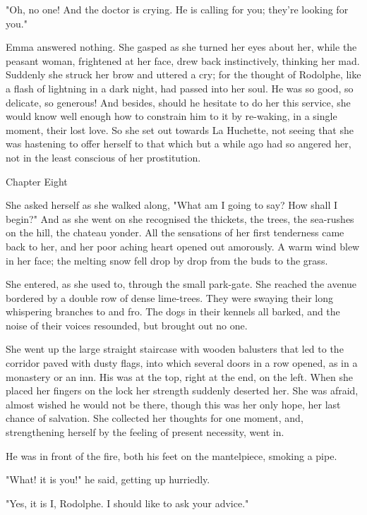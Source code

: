 \documentclass[11pt,twocolumn]{ltugboat}
\begin{document}
"Oh, no one! And the doctor is crying. He is calling for you; they're
looking for you."

Emma answered nothing. She gasped as she turned her eyes about
her, while the peasant woman, frightened at her face, drew back
instinctively, thinking her mad. Suddenly she struck her brow and
uttered a cry; for the thought of Rodolphe, like a flash of lightning in
a dark night, had passed into her soul. He was so good, so delicate, so
generous! And besides, should he hesitate to do her this service, she
would know well enough how to constrain him to it by re-waking, in a
single moment, their lost love. So she set out towards La Huchette, not
seeing that she was hastening to offer herself to that which but a while
ago had so angered her, not in the least conscious of her prostitution.



Chapter Eight

She asked herself as she walked along, "What am I going to say? How
shall I begin?" And as she went on she recognised the thickets,
the trees, the sea-rushes on the hill, the chateau yonder. All the
sensations of her first tenderness came back to her, and her poor aching
heart opened out amorously. A warm wind blew in her face; the melting
snow fell drop by drop from the buds to the grass.

She entered, as she used to, through the small park-gate. She reached
the avenue bordered by a double row of dense lime-trees. They were
swaying their long whispering branches to and fro. The dogs in their
kennels all barked, and the noise of their voices resounded, but brought
out no one.

She went up the large straight staircase with wooden balusters that led
to the corridor paved with dusty flags, into which several doors in a
row opened, as in a monastery or an inn. His was at the top, right
at the end, on the left. When she placed her fingers on the lock her
strength suddenly deserted her. She was afraid, almost wished he
would not be there, though this was her only hope, her last chance of
salvation. She collected her thoughts for one moment, and, strengthening
herself by the feeling of present necessity, went in.

He was in front of the fire, both his feet on the mantelpiece, smoking a
pipe.

"What! it is you!" he said, getting up hurriedly.

"Yes, it is I, Rodolphe. I should like to ask your advice."
\end{document}
